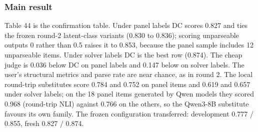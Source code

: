 \documentclass[11pt,letterpaper]{article}
\begin{document}
\subsubsection{Main result}

Table 44 is the confirmation table. Under panel labels DC scores 0.827 and ties the frozen round-2 latent-class variants (0.830 to 0.836); scoring unparseable outputs 0 rather than 0.5 raises it to 0.853, because the panel sample includes 12 unparseable items. Under solver labels DC is the best row (0.874). The cheap judge is 0.036 below DC on panel labels and 0.147 below on solver labels. The user's structural metrics and parse rate are near chance, as in round 2. The local round-trip substitutes score 0.784 and 0.752 on panel items and 0.619 and 0.657 under solver labels; on the 18 panel items generated by Qwen models they scored 0.968 (round-trip NLI) against 0.766 on the others, so the Qwen3-8B substitute favours its own family. The frozen configuration transferred: development 0.777 / 0.855, fresh 0.827 / 0.874.
\end{document}
